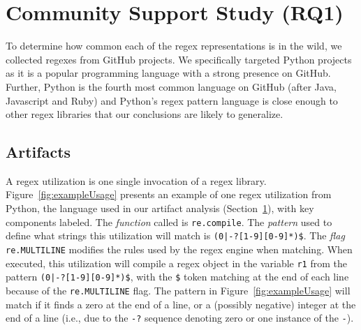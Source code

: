%
%
%
%
%
%
%



\section{Community Support Study (RQ1)}
\label{communitystudy}
To determine how common each of the regex representations is in the wild, we collected
regexes from GitHub projects. We specifically targeted Python projects as it is a popular programming language with a strong presence on GitHub. Further, Python is the fourth most common language on GitHub (after Java, Javascript and Ruby) and Python's regex pattern
language is close enough to other regex libraries that our conclusions are likely to generalize.



\subsection{Artifacts}
A regex {utilization} is one single invocation of a regex library.
Figure~\ref{fig:exampleUsage} presents an example of one regex {utilization} from Python, the language used in our artifact analysis (Section~\ref{communitystudy}), with key components labeled. The \emph{function} called is {\tt re.compile}.  The \emph{pattern} used to define what strings this utilization will match is \verb!(0|-?[1-9][0-9]*)$!.  The \emph{flag} {\tt re.MULTILINE} modifies the rules used by the regex engine when matching. When executed, this {utilization}  will compile a regex object in the variable {\tt r1} from the pattern \verb!(0|-?[1-9][0-9]*)$!, with the \verb!$! token matching at the end of each line because of the {\tt re.MULTILINE} flag.
  The pattern in Figure~\ref{fig:exampleUsage}  will match if it finds a zero at the end of a line, or a (possibly negative) integer at the end of a line (i.e., due to the {\tt -?} sequence denoting zero or one instance of the {\tt -}).

